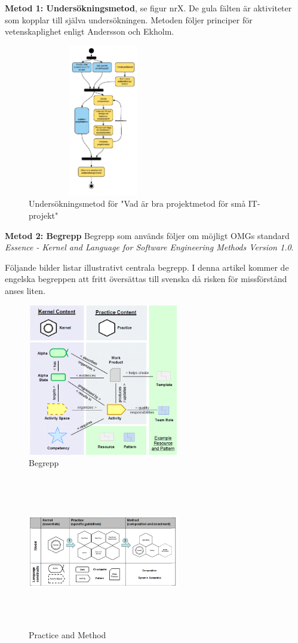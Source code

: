 \textbf{Metod 1: Undersökningsmetod}, se figur nrX. De gula fälten är aktiviteter som 
kopplar till själva undersökningen. Metoden följer principer för vetenskaplighet 
enligt Andersson och Ekholm.
 
\begin{figure}[htbp]
    \centerline{\includegraphics[max height=250px, max width=250px]{Z. images/undersokningsmetod.png}}
    \caption{Undersökningsmetod för "Vad är bra projektmetod för små IT-projekt"}
    \label{fig}
\end{figure}

\textbf{Metod 2: Begrepp}
Begrepp som används följer om möjligt OMGs standard 
\textit{Essence - Kernel and Language for Software Engineering Methods Version 1.0}.

Följande bilder listar illustrativt centrala begrepp. I denna artikel kommer de engelska
begreppen att fritt översättas till svenska då risken för missförstånd anses liten.

\begin{figure}[htbp]
    \centerline{\includegraphics[max height=250px, max width=250px]{Z. images/begrepp.png}}
    \caption{Begrepp}
    \label{fig}
\end{figure}

\begin{figure}[htbp]
    \centerline{\includegraphics[max height=250px, max width=250px]{Z. images/practicemethod.png}}
    \caption{Practice and Method}
    \label{fig}
\end{figure}